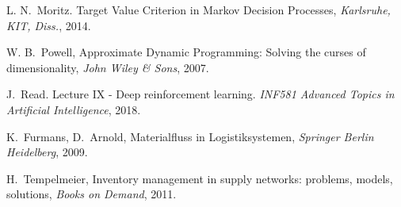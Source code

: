 \documentclass[journal, a4paper]{IEEEtran}
\theoremstyle{plain}
\theoremstyle{definition}
\begin{document}
\begin{thebibliography}{4}

	L. N.~Moritz. Target Value Criterion in Markov Decision Processes,
	\textit{Karlsruhe, KIT, Diss.}, 2014.

	W. B.~Powell,  Approximate Dynamic Programming: Solving the curses of dimensionality,
	{\em John Wiley \& Sons}, 2007.

	J.~Read. Lecture IX - Deep reinforcement learning. \textit{INF581 Advanced Topics in Artificial Intelligence}, 2018.

	K.~Furmans, D.~Arnold, Materialfluss in Logistiksystemen,
	{\em Springer Berlin Heidelberg}, 2009.

	H.~Tempelmeier, Inventory management in supply networks: problems, models, solutions,
	{\em Books on Demand}, 2011.





\end{thebibliography}

\end{document}
